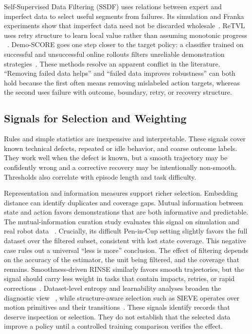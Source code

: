 Self-Supervised Data Filtering (SSDF) uses relations between expert and imperfect data to select useful segments from failures.
Its simulation and Franka experiments show that imperfect data need not be discarded wholesale~\cite{wu2024learning_2401_08957}.
ReTVL uses retry structure to learn local value rather than assuming monotonic progress ~\cite{qin2026beyond_2606_24633}.
Demo-SCORE goes one step closer to the target policy: a classifier trained on successful and unsuccessful online rollouts filters unreliable demonstration strategies~\cite{chen2025curating_2503_03707}.
These methods resolve an apparent conflict in the literature.  ``Removing failed data helps'' and ``failed data improves robustness'' can both hold because the first often means removing mislabeled action targets, whereas the second uses failure with outcome, boundary, retry, or recovery structure.

\subsection{Signals for Selection and Weighting}

Rules and simple statistics are inexpensive and interpretable.
These signals cover known technical defects, repeated or idle behavior, and coarse outcome labels.
They work well when the defect is known, but a smooth trajectory may be confidently wrong and a corrective recovery may be intentionally non-smooth.
Thresholds also correlate with episode length and task difficulty.

Representation and information measures support richer selection.
Embedding distance can identify duplicates and coverage gaps.
Mutual information between state and action favors demonstrations that are both informative and predictable.
The mutual-information curation study evaluates this signal on simulation and real robot data ~\cite{hejna2025robot_2502_08623}.
Crucially, its difficult Pen-in-Cup setting slightly favors the full dataset over the filtered subset, consistent with lost state coverage.
This negative case rules out a universal ``less is more'' conclusion.
The effect of filtering depends on the accuracy of the estimator, the unit being filtered, and the coverage that remains.
Smoothness-driven RINSE similarly favors smooth trajectories, but the signal should carry less weight in tasks that contain impacts, retries, or rapid corrections~\cite{kulkarni2026learning_2604_23000}.
Dataset-level entropy and learnability analyses broaden the diagnostic view ~\cite{xiao2025data_2511_09119}, while structure-aware selection such as SIEVE operates over motion primitives and their transitions~\cite{wu2026sieve_2607_06442}.
These signals identify records that deserve inspection or selection.
They do not establish that the selected data improve a policy until a controlled training comparison verifies the effect.

